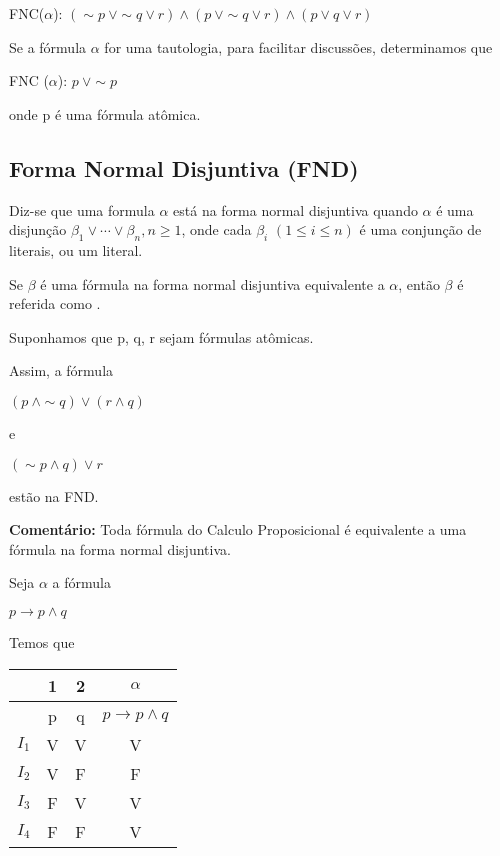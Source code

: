 \noindent FNC($\alpha$): $(\sim p\ \lor \sim q \lor r) \land (p\ \lor \sim q \lor r) \land (p \lor q \lor r)$

Se a fórmula $\alpha$ for uma tautologia, para facilitar discussões, determinamos que

\centerline{FNC ($\alpha$): $p\ \lor \sim p$}

onde p é uma fórmula atômica.

\pagebreak


\subsection{Forma Normal Disjuntiva (FND)}

\begin{defi}
    Diz-se que uma formula $\alpha$ está na forma normal disjuntiva quando $\alpha$ é uma disjunção $\beta_1 \lor \cdots \lor \beta_n, n \geq 1$, onde cada $\beta_i$ $(1 \leq i \leq n)$ é uma conjunção de literais, ou um literal.
\end{defi}

\begin{defi}
    Se $\beta$ é uma fórmula na forma normal disjuntiva equivalente a $\alpha$, então $\beta$ é referida como .
\end{defi}

\setcounter{exemplo}{0}
\begin{exemplo}
    Suponhamos que p, q, r sejam fórmulas atômicas.

    Assim, a fórmula

    \begin{center}
        $(p\ \land \sim q) \lor (r \land q)$

        e

        $(\sim p \land q) \lor r$
    \end{center}

    estão na FND.
\end{exemplo}

\noindent \textbf{Comentário:} Toda fórmula do Calculo Proposicional é equivalente a uma fórmula na forma normal disjuntiva.

\begin{exemplo}
    Seja $\alpha$ a fórmula

    \centerline{$p \to p \land q$}
\end{exemplo}

Temos que

\begin{tabular}{c | c c c}
    & 1 & 2 & $\alpha$ \\ \hline
    & p & q & $p \to p \land q$ \\
    $I_1$ & V & V & V \\
    $I_2$ & V & F & F \\
    $I_3$ & F & V & V \\
    $I_4$ & F & F & V \\
\end{tabular}

